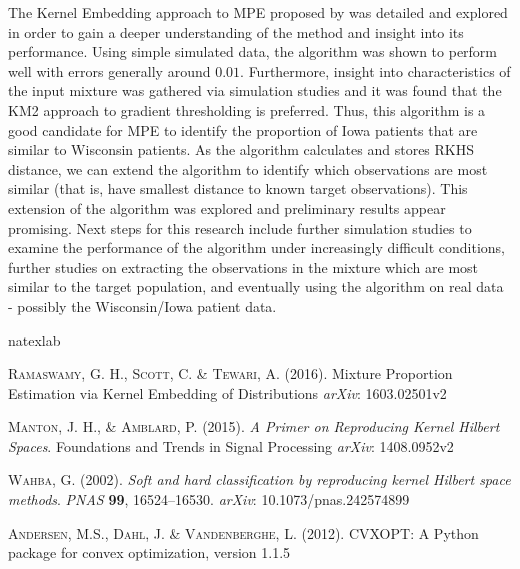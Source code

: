 \documentclass[lineno]{biometrika}
\begin{document}
The Kernel Embedding approach to MPE proposed by \citet{Ramaswamy:2016} was detailed and explored in order to gain a deeper understanding of the method and insight into its performance. Using simple simulated data, the algorithm was shown to perform well with errors generally around $0.01$. Furthermore, insight into characteristics of the input mixture was gathered via simulation studies and it was found that the KM2 approach to gradient thresholding is preferred. Thus, this algorithm is a good candidate for MPE to identify the proportion of Iowa patients that are similar to Wisconsin patients.  As the algorithm calculates and stores RKHS distance, we can extend the algorithm to identify which observations are most similar (that is, have smallest distance to known target observations). This extension of the algorithm was explored and preliminary results appear promising. Next steps for this research include further simulation studies to examine the performance of the algorithm under increasingly difficult conditions, further studies on extracting the observations in the mixture which are most similar to the target population, and eventually using the algorithm on real data - possibly the Wisconsin/Iowa patient data.

\vspace*{-10pt}

%
%


\begin{thebibliography}{7}
\expandafter\ifx\csname natexlab\endcsname\relax\def\natexlab#1{#1}\fi

\textsc{Ramaswamy, G. H., Scott, C. \& Tewari, A.} (2016).
\newblock Mixture Proportion Estimation via Kernel Embedding of Distributions
\newblock \textit{arXiv}: 1603.02501v2

\textsc{Manton, J. H., \& Amblard, P.} (2015).
\newblock \textit{{A Primer on Reproducing Kernel Hilbert Spaces}}.
\newblock Foundations and Trends in Signal Processing
\newblock \textit{arXiv}: 1408.0952v2 

\textsc{Wahba, G.} (2002).
\newblock \textit{{Soft and hard classification by reproducing kernel Hilbert space methods}}.
\newblock \textit{PNAS} \textbf{99}, 16524--16530.
\newblock \textit{arXiv}: 10.1073/pnas.242574899

\textsc{Andersen, M.S., Dahl, J. \& Vandenberghe, L.} (2012).
\newblock CVXOPT: A Python package for convex optimization, version 1.1.5

\end{thebibliography}
\end{document}
